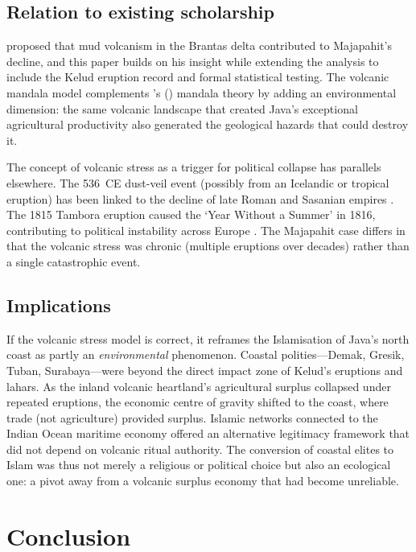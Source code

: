 \documentclass[12pt,a4paper]{article}
\begin{document}
\subsection{Relation to existing scholarship}

\citet{satyana2015} proposed that mud volcanism in the Brantas delta contributed to Majapahit's decline, and this paper builds on his insight while extending the analysis to include the Kelud eruption record and formal statistical testing.
The volcanic mandala model complements \citeauthor{wolters1982}'s (\citeyear{wolters1982}) mandala theory by adding an environmental dimension: the same volcanic landscape that created Java's exceptional agricultural productivity also generated the geological hazards that could destroy it.

The concept of volcanic stress as a trigger for political collapse has parallels elsewhere.
The 536~CE dust-veil event (possibly from an Icelandic or tropical eruption) has been linked to the decline of late Roman and Sasanian empires \citep{buentiempo2016}.
The 1815 Tambora eruption caused the `Year Without a Summer' in 1816, contributing to political instability across Europe \citep{wood2014}.
The Majapahit case differs in that the volcanic stress was chronic (multiple eruptions over decades) rather than a single catastrophic event.

\subsection{Implications}

If the volcanic stress model is correct, it reframes the Islamisation of Java's north coast as partly an \textit{environmental} phenomenon.
Coastal polities---Demak, Gresik, Tuban, Surabaya---were beyond the direct impact zone of Kelud's eruptions and lahars.
As the inland volcanic heartland's agricultural surplus collapsed under repeated eruptions, the economic centre of gravity shifted to the coast, where trade (not agriculture) provided surplus.
Islamic networks connected to the Indian Ocean maritime economy offered an alternative legitimacy framework that did not depend on volcanic ritual authority.
The conversion of coastal elites to Islam was thus not merely a religious or political choice but also an ecological one: a pivot away from a volcanic surplus economy that had become unreliable.

\section{Conclusion}
\end{document}
